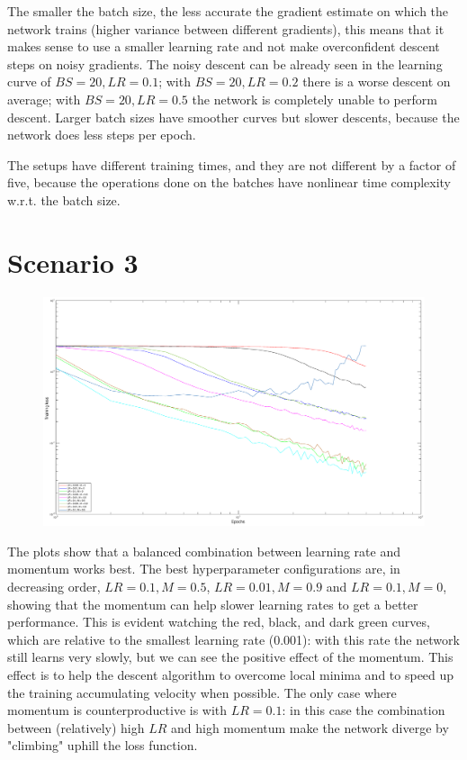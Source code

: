 \documentclass{article}
\begin{document}
    The smaller the batch size, the less accurate the gradient estimate on which the network trains (higher variance between different gradients), this means that it makes sense to use a smaller learning rate
    and not make overconfident descent steps on noisy gradients. The noisy descent can be already seen in the learning curve of $BS = 20, LR = 0.1$; with $BS = 20, LR = 0.2$ there is a worse descent on average; 
    with $BS = 20, LR = 0.5$ the network is completely unable to perform descent. Larger batch sizes have smoother curves but slower descents, because the network does less steps per epoch.
    
    The setups have different training times, and they are not different by a factor of five, because the operations done on the batches have nonlinear time complexity w.r.t. the batch size.
    
    
    
\section*{Scenario 3}
	\begin{figure}[!htb]
        \centering
        \includegraphics[width=\textwidth]{figures/sc3_tr_loss}
    \end{figure}
    
    The plots show that a balanced combination between learning rate and momentum works best. The best hyperparameter configurations are, in decreasing order, 
    $LR = 0.1, M = 0.5$, $LR = 0.01, M = 0.9$ and $LR = 0.1, M = 0$, showing that the momentum can help slower learning rates to get a better performance. 
    This is evident watching the red, black, and dark green curves, which are relative to the smallest learning rate (0.001): with this rate the network still learns very slowly, but we can see the positive effect of the momentum. 
    This effect is to help the descent algorithm to overcome local minima and to speed up the training accumulating velocity when possible.
    The only case where momentum is counterproductive is with $LR = 0.1$: in this case the combination between (relatively) high $LR$ and high momentum make the network diverge by "climbing" uphill the loss function.
    
\end{document}
